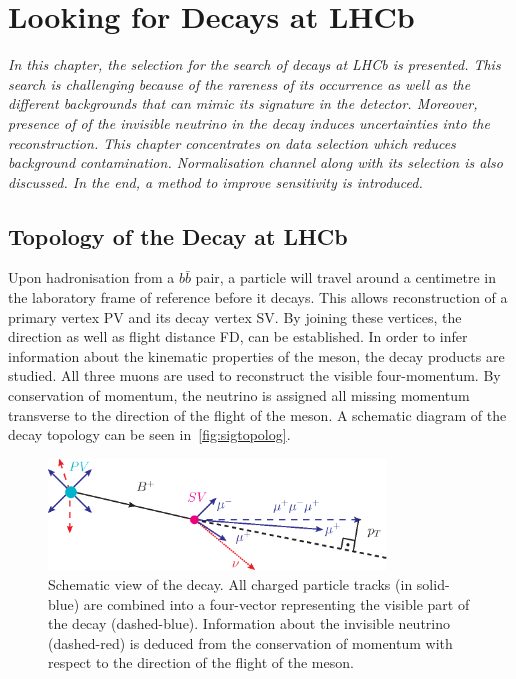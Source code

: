 \chapter{Looking for \mb{\Bmumumu} Decays at LHCb}
\label{chap:sel}

\textit{In this chapter, the selection for the search of \Bmumumu decays at LHCb is presented. This search is challenging because of the rareness of its occurrence as well as the different backgrounds that can mimic its signature in the detector. Moreover, presence of of the invisible neutrino in the decay induces uncertainties into the reconstruction. This chapter concentrates on data selection which reduces background contamination. Normalisation channel along with its selection is also discussed. In the end, a method to improve sensitivity is introduced.}



\section{Topology of the \mb{\Bmumumu} Decay at LHCb}

Upon hadronisation from a $b\bar{b}$ pair, a \Bpm particle will travel around a centimetre in the laboratory frame of reference before it decays. This allows reconstruction of a primary vertex \gls{PV} and its decay vertex \gls{SV}. By joining these vertices, the direction as well as flight distance \gls{FD}, can be established. In order to infer information about the kinematic properties of the \Bpm meson, the decay products are studied. All three muons are used to reconstruct the visible four-momentum. By conservation of momentum, %
the neutrino is assigned all missing momentum transverse to the direction of the flight of the \Bpm meson. A schematic diagram of the decay topology can be seen in~\autoref{fig:sigtopolog}.

\begin{figure}[!h]
	\centering
	\includegraphics[width = 0.8\textwidth]{figs/sel/DecReco_fin.eps}
	\caption{Schematic view of the \Bmumumu decay. All charged particle tracks (in solid-blue) are combined into a four-vector representing the visible part of the decay (dashed-blue). Information about the invisible neutrino (dashed-red) is deduced from the conservation of momentum with respect to the direction of the flight of the \Bpm meson.}%
	\label{fig:sigtopolog}
\end{figure}

